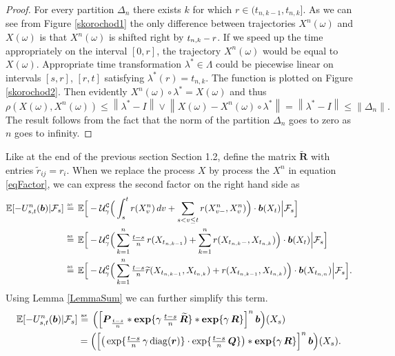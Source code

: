 \begin{proof}
For every partition $\Delta_n$ there exists $k$ for which $r\in(t_{n,k-1},t_{n,k}]$. 
As we can see from Figure \ref{skorochod1} the only difference between trajectories  $X^n(\omega)$ and $X(\omega)$ is that $X^n(\omega)$ is shifted right by $\mbox{\small{$t_{n,k}-r$}}$. If we speed up the time appropriately on the interval $[0,r]$, the trajectory $X^n(\omega)$ would be equal to $X(\omega)$. Appropriate time transformation $\lambda^*\in\Lambda$ could be piecewise linear on intervals $[s,r]$, $[r,t]$ satisfying $\lambda^*(r)=t_{n,k}$. The function is plotted on Figure \ref{skorochod2}. Then evidently $X^n(\omega)\circ\lambda^*=X(\omega)$ and thus
\[\rho(X(\omega),X^n(\omega))\leq  \left\|\lambda^*-I\right\| \vee \left\|X(\omega)-X^n(\omega)\circ\lambda^*\right\| =\left\|\lambda^*-I\right\|\leq \left\|\Delta_n\right\|.\]
The result follows from the fact that the norm of the partition $\Delta_n$ goes to zero as $n$ goes to infinity.
\end{proof}
Like at the end of the previous section Section 1.2, define the matrix $\bm{\widetilde{R}}$ with entries $\widetilde{r}_{ij}=r_{i}$. When we replace the process $X$ by process the $X^n$ in equation \eqref{eqFactor}, we can express the second factor on the right hand side  as
\begin{equation}
\label{longterm}
\begin{split}
\mathbb{E}[-U_{s,t}^n(\bm{b})|\mathcal{F}_s]&\aseq\mathbb{E}\Big[-\mathcal{U}_{\gamma}^{\texttt{C}}\Big(\int_s^t r(X^n_v)\,dv + \sum_{s< v\leq t} r(X^n_{v-},X^n_{v})\Big)\cdot \bm{b}(X_t)\Big|\mathcal{F}_s\Big]\\
&\aseq\mathbb{E}\Big[-\mathcal{U}_{\gamma}^{\texttt{C}}\Big(\sum_{k=1}^n \tfrac{t-s}{n}\,r(X_{t_{n,k-1}})+\sum_{k=1}^n r(X_{t_{n,k}-},X_{t_{n,k}})  \Big)\cdot \bm{b}(X_t)\Big|\mathcal{F}_s\Big]\\
& \aseq \mathbb{E}\Big[ -\mathcal{U}_{\gamma}^{\texttt{C}}\Big(\sum_{k=1}^n \tfrac{t-s}{n} \widetilde{r}(X_{t_{n,k-1}},X_{t_{n,k}})+r(X_{t_{n,k-1}},X_{t_{n,k}})  \Big)\cdot \bm{b}(X_{t_{n,n}})\Big|\mathcal{F}_s\Big].
\end{split}
\end{equation}
Using Lemma \ref{LemmaSum} we can further simplify this term.
\begin{equation}
\label{longterm2}
\begin{split}
\mathbb{E}[-U_{s,t}^n(\bm{b})|\mathcal{F}_s]&\aseq \Big(\Big[\bm{P}_{\frac{t-s}{n}}\ast\bm{\exp}\{\gamma\,\tfrac{t-s}{n}\,\bm{\widetilde{R}}\} \ast\bm{\exp}\{\gamma\,\bm{R}\}\Big]^n\,\bm{b} \Big) (X_s)\\
&=\Big(\Big[\big(\exp\{\tfrac{t-s}{n}\,\gamma\,\diag(\bm{r})\}\cdot \exp\{\tfrac{t-s}{n}\,\bm{Q}\}\big) \ast\bm{\exp}\{\gamma\,\bm{R}\}\Big]^n\,\bm{b} \Big) (X_s).
\end{split}
\end{equation}
